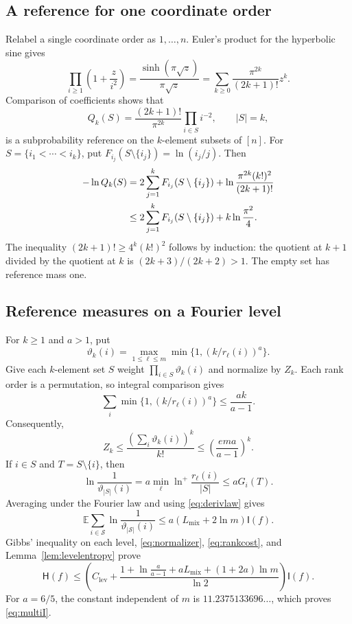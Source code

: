 \documentclass[11pt]{amsart}
\theoremstyle{definition}
\theoremstyle{remark}
\newcommand{\E}{\mathbb E}
\newcommand{\HH}{\mathsf H}
\newcommand{\I}{\mathsf I}
\newcommand{\Lmix}{L_{\mathrm{mix}}}
\newcommand{\Clev}{C_{\mathrm{lev}}}
\begin{document}
\subsection{A reference for one coordinate order}

Relabel a single coordinate order as $1,\ldots,n$.
Euler's product for the hyperbolic sine \cite[Eq.~4.36.1]{DLMF} gives
\[
 \prod_{i\ge1}\left(1+\frac z{i^2}\right)
 =\frac{\sinh(\pi\sqrt z)}{\pi\sqrt z}
 =\sum_{k\ge0}\frac{\pi^{2k}}{(2k+1)!}z^k.
\]
Comparison of coefficients shows that
\begin{equation}\label{eq:euler-reference}
 Q_k(S)=\frac{(2k+1)!}{\pi^{2k}}\prod_{i\in S}i^{-2},
 \qquad |S|=k,
\end{equation}
is a subprobability reference on the $k$-element subsets of $[n]$.
For $S=\{i_1<\cdots<i_k\}$, put
$F_{i_j}(S\setminus\{i_j\})=\ln(i_j/j)$.
Then
\begin{align}
 -\ln Q_k(S)
 &=2\sum_{j=1}^kF_{i_j}(S\setminus\{i_j\})
     +\ln\frac{\pi^{2k}(k!)^2}{(2k+1)!}\notag\\
 &\le2\sum_{j=1}^kF_{i_j}(S\setminus\{i_j\})
     +k\ln\frac{\pi^2}{4}.
 \label{eq:euler-cost}
\end{align}
The inequality $(2k+1)!\ge4^k(k!)^2$ follows by induction: the quotient
at $k+1$ divided by the quotient at $k$ is $(2k+3)/(2k+2)>1$.
The empty set has reference mass one.

\subsection{Reference measures on a Fourier level}

For $k\ge1$ and $a>1$, put
\begin{equation}\label{eq:rankweights}
 \vartheta_k(i)=\max_{1\le\ell\le m}
                  \min\{1,(k/r_\ell(i))^a\}.
\end{equation}
Give each $k$-element set $S$ weight $\prod_{i\in S}\vartheta_k(i)$ and normalize by $Z_k$.
Each rank order is a permutation, so integral comparison gives
\[
 \sum_i\min\{1,(k/r_\ell(i))^a\}\le\frac{ak}{a-1}.
\]
Consequently,
\begin{equation}\label{eq:normalizer}
 Z_k\le\frac{(\sum_i\vartheta_k(i))^k}{k!}
       \le\left(\frac{ema}{a-1}\right)^k.
\end{equation}
If $i\in S$ and $T=S\setminus\{i\}$, then
\[
 \ln\frac1{\vartheta_{|S|}(i)}
 =a\min_\ell\ln^+\frac{r_\ell(i)}{|S|}
 \le aG_i(T).
\]
Averaging under the Fourier law and using \eqref{eq:derivlaw} gives
\begin{equation}\label{eq:rankcost}
 \E\sum_{i\in\mathcal S}\ln\frac1{\vartheta_{|\mathcal S|}(i)}
 \le a(\Lmix+2\ln m)\I(f).
\end{equation}
Gibbs' inequality on each level, \eqref{eq:normalizer}, \eqref{eq:rankcost}, and Lemma~\ref{lem:levelentropy} prove
\begin{equation}\label{eq:ordinaryexact}
 \HH(f)\le
 \left(\Clev+\frac{1+\ln\frac a{a-1}+a\Lmix+(1+2a)\ln m}{\ln2}\right)\I(f).
\end{equation}
For $a=6/5$, the constant independent of $m$ is
$11.2375133696\ldots$, which proves \eqref{eq:multiI}.
\end{document}

